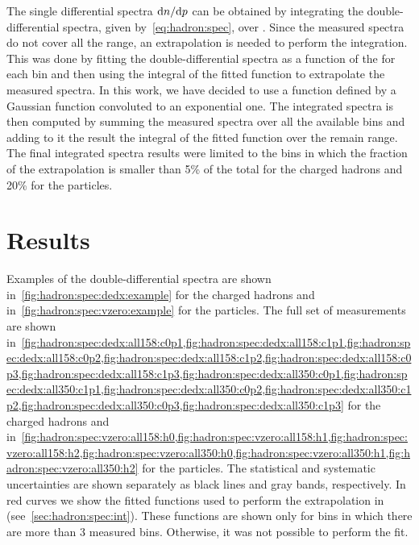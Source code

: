 The single differential spectra $\text{d}n/\text{d}p$ can be obtained
by integrating the double-differential spectra,
given by~\cref{eq:hadron:spec}, over \pT. Since the measured
spectra do not cover all the \pT range, an extrapolation is needed
to perform the integration. This was done by fitting
the double-differential spectra as a function of the \pT for each \pp bin
and then using the integral of the fitted function to
extrapolate the measured spectra.  
In this work, we have decided to use a function
defined by a Gaussian function convoluted to
an exponential one. 
The \pT integrated spectra is then computed by summing
the measured spectra over all the available \pT bins
and adding to it the result the integral of the fitted function
over the remain \pT range. The final \pT integrated spectra results
were limited to the \pp bins in which the fraction of the extrapolation
is smaller than 5\% of the total for the charged hadrons and 20\% for the \vzero particles.


\section{Results}
\label{sec:hadron:results}

Examples of the double-differential spectra are shown
in~\cref{fig:hadron:spec:dedx:example} for the charged hadrons
and in~\cref{fig:hadron:spec:vzero:example}
for the \vzero particles. The full set of measurements
are shown
in~\cref{fig:hadron:spec:dedx:all158:c0p1,fig:hadron:spec:dedx:all158:c1p1,fig:hadron:spec:dedx:all158:c0p2,fig:hadron:spec:dedx:all158:c1p2,fig:hadron:spec:dedx:all158:c0p3,fig:hadron:spec:dedx:all158:c1p3,fig:hadron:spec:dedx:all350:c0p1,fig:hadron:spec:dedx:all350:c1p1,fig:hadron:spec:dedx:all350:c0p2,fig:hadron:spec:dedx:all350:c1p2,fig:hadron:spec:dedx:all350:c0p3,fig:hadron:spec:dedx:all350:c1p3}
for the charged hadrons and
in~\cref{fig:hadron:spec:vzero:all158:h0,fig:hadron:spec:vzero:all158:h1,fig:hadron:spec:vzero:all158:h2,fig:hadron:spec:vzero:all350:h0,fig:hadron:spec:vzero:all350:h1,fig:hadron:spec:vzero:all350:h2}
for the \vzero particles.
The statistical and systematic uncertainties are shown
separately as black lines and gray bands, respectively.
In red curves we show the fitted functions used to perform
the extrapolation in \pT (see~\cref{sec:hadron:spec:int}).
These functions are shown only for \pp bins in which
there are more than 3 measured \pT bins. Otherwise,
it was not possible to perform the fit.


